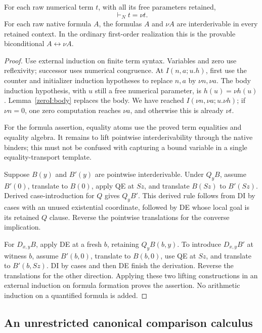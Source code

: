 \begin{lemma}\label{zeroI:soundnorm}
For each raw numerical term $t$, with all its free parameters retained,
\[
 \vdash_N t=\nu t.
\]
For each raw native formula $A$, the formulas $A$ and $\nu A$ are
interderivable in every retained context.  In the ordinary first-order
realization this is the provable biconditional $A\leftrightarrow\nu A$.
\end{lemma}
\begin{proof}
Use external induction on finite term syntax.  Variables and zero use
reflexivity; successor uses numerical congruence.  At $I(n,a;u.h)$,
first use the counter and initializer induction hypotheses to replace
$n,a$ by $\nu n,\nu a$.  The body induction hypothesis, with $u$ still
a free numerical parameter, is $h(u)=\nu h(u)$.
Lemma~\ref{zeroI:body} replaces the body.  We have reached
$I(\nu n,\nu a;u.\nu h)$; if $\nu n=0$, one zero computation reaches
$\nu a$, and otherwise this is already $\nu t$.

For the formula assertion, equality atoms use the proved term equalities
and equality algebra.  It remains to lift pointwise interderivability
through the native binders; this must not be confused with capturing a
bound variable in a single equality-transport template.

Suppose $B(y)$ and $B'(y)$ are pointwise interderivable.  Under $Q_yB$,
assume $B'(0)$, translate to $B(0)$, apply QE at $Sz$, and translate
$B(Sz)$ to $B'(Sz)$.  Derived case-introduction for $Q$ gives $Q_yB'$.
This derived rule follows from DI by cases with an unused existential
coordinate, followed by DE whose local goal is its retained $Q$ clause.
Reverse the pointwise translations for the converse implication.

For $D_{x,y}B$, apply DE at a fresh $b$, retaining $Q_yB(b,y)$.  To
introduce $D_{x,y}B'$ at witness $b$, assume $B'(b,0)$, translate to
$B(b,0)$, use QE at $Sz$, and translate to $B'(b,Sz)$.  DI by cases and
then DE finish the derivation.  Reverse the translations for the other
direction.  Applying these two lifting constructions in an external
induction on formula formation proves the assertion.  No arithmetic
induction on a quantified formula is added.
\end{proof}

\subsection{An unrestricted canonical comparison calculus}

